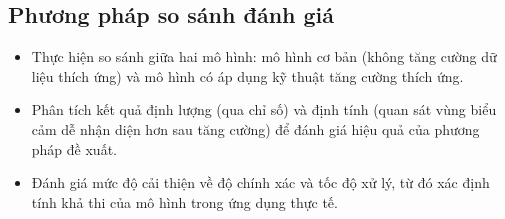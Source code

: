 \subsection{Phương pháp so sánh đánh giá}

\begin{itemize}
    \item Thực hiện so sánh giữa hai mô hình: mô hình cơ bản (không tăng cường dữ liệu thích ứng) và mô hình có áp dụng kỹ thuật tăng cường thích ứng.
    \item Phân tích kết quả định lượng (qua chỉ số) và định tính (quan sát vùng biểu cảm dễ nhận diện hơn sau tăng cường) để đánh giá hiệu quả của phương pháp đề xuất.
    \item Đánh giá mức độ cải thiện về độ chính xác và tốc độ xử lý, từ đó xác định tính khả thi của mô hình trong ứng dụng thực tế.
\end{itemize}